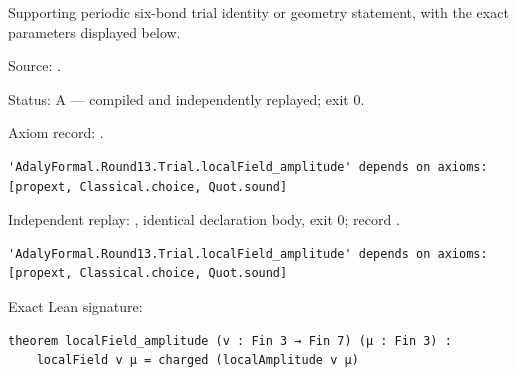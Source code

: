 \begin{theorem}[bp-415]
\label{bp-415}
\leanok
Supporting periodic six-bond trial identity or geometry statement, with the exact parameters displayed below.

\par Source: \texttt{}.
\par Status: A — compiled and independently replayed; exit 0.
\par Axiom record: \texttt{}.
\begin{verbatim}
'AdalyFormal.Round13.Trial.localField_amplitude' depends on axioms: [propext, Classical.choice, Quot.sound]
\end{verbatim}
\par Independent replay: \texttt{}, identical declaration body, exit 0; record \texttt{}.
\begin{verbatim}
'AdalyFormal.Round13.Trial.localField_amplitude' depends on axioms: [propext, Classical.choice, Quot.sound]
\end{verbatim}
\par Exact Lean signature:
\begin{verbatim}
theorem localField_amplitude (v : Fin 3 → Fin 7) (μ : Fin 3) :
    localField v μ = charged (localAmplitude v μ)
\end{verbatim}
\end{theorem}

